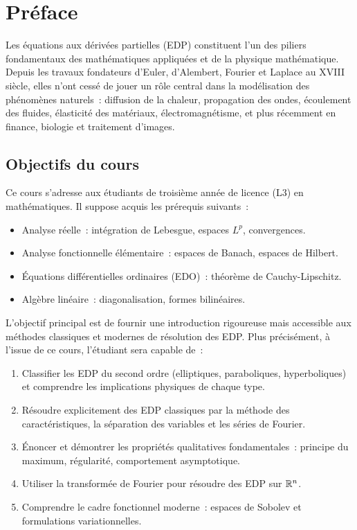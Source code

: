 \chapter*{Pr\'eface}

Les \'equations aux d\'eriv\'ees partielles (EDP) constituent l'un des piliers
fondamentaux des math\'ematiques appliqu\'ees et de la physique math\'ematique.
Depuis les travaux fondateurs d'Euler, d'Alembert, Fourier et Laplace au
XVIII\ieme{} si\`ecle, elles n'ont cess\'e de jouer un r\^ole central dans la
mod\'elisation des ph\'enom\`enes naturels~: diffusion de la chaleur, propagation
des ondes, \'ecoulement des fluides, \'elasticit\'e des mat\'eriaux, \'electromagn\'etisme,
et plus r\'ecemment en finance, biologie et traitement d'images.

\section*{Objectifs du cours}

Ce cours s'adresse aux \'etudiants de troisi\`eme ann\'ee de licence (L3) en
math\'ematiques. Il suppose acquis les pr\'erequis suivants~:
\begin{itemize}
    \item Analyse r\'eelle~: int\'egration de Lebesgue, espaces $L^p$, convergences.
    \item Analyse fonctionnelle \'el\'ementaire~: espaces de Banach, espaces de Hilbert.
    \item \'Equations diff\'erentielles ordinaires (EDO)~: th\'eor\`eme de Cauchy-Lipschitz.
    \item Alg\`ebre lin\'eaire~: diagonalisation, formes bilin\'eaires.
\end{itemize}

L'objectif principal est de fournir une introduction rigoureuse mais accessible aux
m\'ethodes classiques et modernes de r\'esolution des EDP. Plus pr\'ecis\'ement, \`a
l'issue de ce cours, l'\'etudiant sera capable de~:
\begin{enumerate}
    \item Classifier les EDP du second ordre (elliptiques, paraboliques, hyperboliques)
          et comprendre les implications physiques de chaque type.
    \item R\'esoudre explicitement des EDP classiques par la m\'ethode des
          caract\'eristiques, la s\'eparation des variables et les s\'eries de Fourier.
    \item \'Enoncer et d\'emontrer les propri\'et\'es qualitatives fondamentales~:
          principe du maximum, r\'egularit\'e, comportement asymptotique.
    \item Utiliser la transform\'ee de Fourier pour r\'esoudre des EDP sur $\mathbb{R}^n$.
    \item Comprendre le cadre fonctionnel moderne~: espaces de Sobolev et
          formulations variationnelles.
\end{enumerate}

